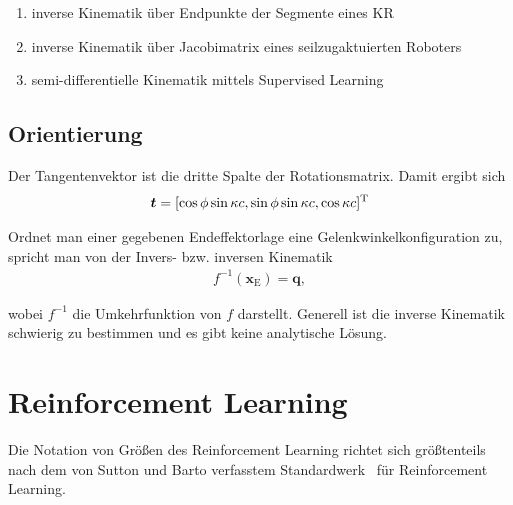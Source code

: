 \begin{enumerate}
\item inverse Kinematik über Endpunkte der Segmente eines KR \cite{NCJW09}
\item inverse Kinematik über Jacobimatrix eines seilzugaktuierten Roboters \cite{JW06}
\item semi-differentielle Kinematik mittels Supervised Learning \cite{TFCL16}
\end{enumerate}

\subsection{Orientierung}
\label{subsec:orientierung}




\vspace{5cm} Der Tangentenvektor ist die dritte Spalte der Rotationsmatrix. Damit ergibt sich
\begin{align}
\bm{t} = [\cos\phi \sin\kappa c, \sin\phi \sin\kappa c, \cos\kappa c ]^{\mathrm{T}}
\label{eq:tangentenvektor}
\end{align}

Ordnet man einer gegebenen Endeffektorlage eine Gelenkwinkelkonfiguration zu, spricht man von der Invers- bzw. inversen Kinematik
%
\begin{align}
f^{-1}(\bm{x}_\mathrm{E}) = \bm{q}, 
\label{eq:inverskinematik}
\end{align} 

wobei $f^{-1}$ die Umkehrfunktion von $f$ darstellt. Generell ist die inverse Kinematik schwierig zu bestimmen und es gibt keine analytische Lösung.

\section{Reinforcement Learning}
\label{sec:RLallgemein}

Die Notation von Größen des Reinforcement Learning richtet sich größtenteils nach dem von Sutton und Barto verfasstem Standardwerk~\cite{SB98} für Reinforcement Learning. 





